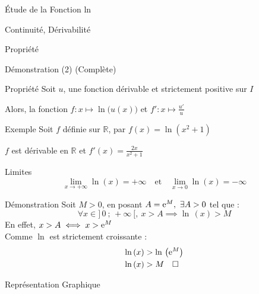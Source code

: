 \documentclass{cours}
\begin{document}
\begin{Gpartie}{Étude de la Fonction ln}
\begin{Spartie}{Continuité, Dérivabilité}
\begin{SSpartie}{Propriété}
\begin{SSSpartie}{Démonstration (2) (Complète)}
                \end{SSSpartie}
            \end{SSpartie}
            \begin{SSpartie}{Propriété}
                Soit $u$, une fonction dérivable et strictement positive sur $I$

                Alors, la fonction $f:x\mapsto\ln\big(u(x)\big)$ et $\boxed{f':x\mapsto\frac{u'}{u}}$
                \begin{SSSpartie}{Exemple}
                    Soit $f$ définie sur $\mathbb{R}$, par $f(x)=\ln(x^2+1)$

                    $f$ est dérivable en $\mathbb{R}$ et $f'(x)=\frac{2x}{x^2+1}$
                \end{SSSpartie}
            \end{SSpartie}
        \end{Spartie}
        \begin{Spartie}{Limites}
            \[\boxed{\lim_{x\to+\infty}\ln(x)=+\infty\quad\text{et}\quad\lim_{x\to 0}\ln(x)=-\infty}\]
            \begin{SSpartie}{Démonstration} 
                Soit $M>0$, en posant $A=\mathrm{e}^M,~\exists A>0$ tel que :
                \[\forall x\in\big]\,0~;\,+\infty~\big[,~x>A\implies\ln\,(x)>M\]
                En effet, $x>A\iff x>\mathrm{e}^M$ \\ Comme $\ln$ est strictement croissante :
                \[\begin{aligned}[t]
                    \ln\,(x)&>\ln\,\left(\mathrm{e}^M\right) \\
                    \ln\,(x)&>M\quad\square
                \end{aligned}\]
            \end{SSpartie}
        \end{Spartie}
        \begin{Spartie}{Représentation Graphique}
            \begin{center}
                \parbox{\linewidth}{}
            \end{center}
        \end{Spartie}
    \end{Gpartie}
\end{document}

